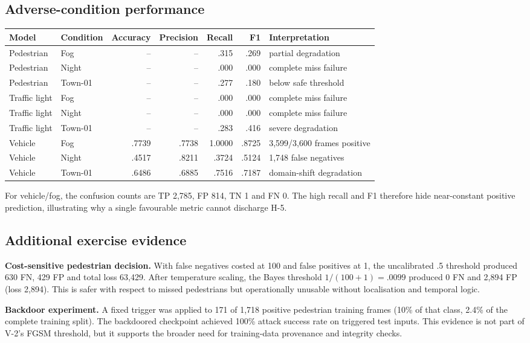 \documentclass[nologo,a4paper,12pt]{article}
\begin{document}
\subsection{Adverse-condition performance}

{\small
\begin{tabularx}{\linewidth}{@{}llrrrrY@{}}
\toprule
Model & Condition & Accuracy & Precision & Recall & F1 & Interpretation \\
\midrule
Pedestrian & Fog & -- & -- & .315 & .269 & partial degradation \\
Pedestrian & Night & -- & -- & .000 & .000 & complete miss failure \\
Pedestrian & Town-01 & -- & -- & .277 & .180 & below safe threshold \\
Traffic light & Fog & -- & -- & .000 & .000 & complete miss failure \\
Traffic light & Night & -- & -- & .000 & .000 & complete miss failure \\
Traffic light & Town-01 & -- & -- & .283 & .416 & severe degradation \\
Vehicle & Fog & .7739 & .7738 & 1.0000 & .8725 & 3,599/3,600 frames positive \\
Vehicle & Night & .4517 & .8211 & .3724 & .5124 & 1,748 false negatives \\
Vehicle & Town-01 & .6486 & .6885 & .7516 & .7187 & domain-shift degradation \\
\bottomrule
\end{tabularx}}

For vehicle/fog, the confusion counts are TP 2,785, FP 814, TN 1 and FN 0. The high recall and
F1 therefore hide near-constant positive prediction, illustrating why a single favourable metric
cannot discharge H-5.

\subsection{Additional exercise evidence}
\label{app:additional-evidence}

\textbf{Cost-sensitive pedestrian decision.} With false negatives costed at 100 and false
positives at 1, the uncalibrated .5 threshold produced 630 FN, 429 FP and total loss 63,429.
After temperature scaling, the Bayes threshold $1/(100+1)=.0099$ produced 0 FN and 2,894 FP
(loss 2,894). This is safer with respect to missed pedestrians but operationally unusable without
localisation and temporal logic.

\textbf{Backdoor experiment.} A fixed trigger was applied to 171 of 1,718 positive pedestrian
training frames (10\% of that class, 2.4\% of the complete training split). The backdoored
checkpoint achieved 100\% attack success rate on triggered test inputs. This evidence is not part
of V-2's FGSM threshold, but it supports the broader need for training-data provenance and
integrity checks.
\end{document}
